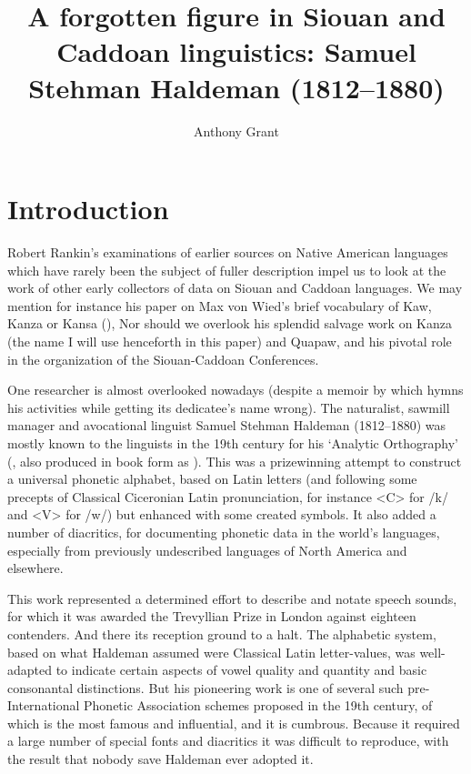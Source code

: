 \documentclass[output=paper]{LSP/langsci}
\author{Anthony Grant}
\title{A forgotten figure in Siouan and Caddoan linguistics:  Samuel Stehman Haldeman (1812--1880)}
\begin{document}
\section{Introduction}

Robert Rankin's examinations of earlier sources on Native American languages which have rarely been the subject of fuller description impel us to look at the work of other early collectors of data on Siouan and Caddoan languages. We may mention for instance his paper on Max von Wied's \citeyearpar{Maximilian18391841} brief vocabulary of Kaw, Kanza or Kansa  (\citealt{Rankin1994}), Nor should we overlook his splendid salvage work on Kanza (the name I will use henceforth in this paper) and Quapaw, and his pivotal role in the organization of the Siouan-Caddoan Conferences.

One researcher is almost overlooked nowadays (despite a memoir by \citealt{Lesley1881} which hymns his activities while getting its dedicatee's name wrong). The naturalist, sawmill manager and avocational linguist Samuel Stehman Haldeman (1812--1880)  was mostly known to the linguists in the 19th century for his `Analytic Orthography' (\citealt{Haldeman1859}, also produced in book form as \citealt{Haldeman1860}). This was a prizewinning attempt to construct a  universal phonetic alphabet, based on Latin letters (and following some precepts of Classical Ciceronian Latin pronunciation, for instance <C> for /k/ and <V> for /w/) but enhanced with some created symbols. It also added a number of diacritics,  for documenting phonetic data in the world's languages, especially from previously undescribed languages of North America and elsewhere.  

This work represented a determined effort to describe and notate speech sounds, for which it was awarded the Trevyllian Prize in London against eighteen contenders. And there its reception ground to a halt. The alphabetic system, based on what Haldeman assumed were Classical Latin letter-values,  was well-adapted to indicate certain aspects of vowel quality and quantity and basic consonantal distinctions. But his pioneering work is one of several such pre-International Phonetic Association  schemes proposed in the 19th century, of which \citet{Lepsius1863} is the most famous and influential, and it is cumbrous.  Because it required a large number of special fonts and diacritics it was difficult to reproduce, with the result that nobody save Haldeman ever adopted it.    
\end{document}
